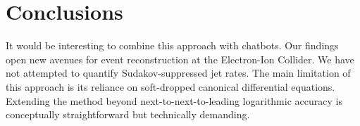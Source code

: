 \section{Conclusions}\label{sec:conclusions}

It would be interesting to combine this approach with chatbots. Our
findings open new avenues for event reconstruction at the Electron-Ion
Collider. We have not attempted to quantify Sudakov-suppressed jet
rates. The main limitation of this approach is its reliance on
soft-dropped canonical differential equations. Extending the method
beyond next-to-next-to-leading logarithmic accuracy is conceptually
straightforward but technically demanding.

